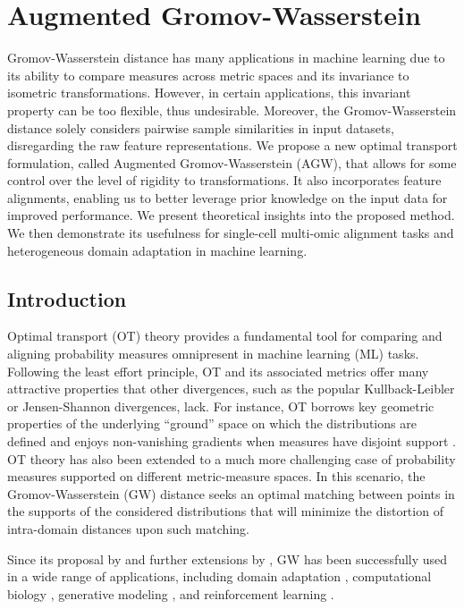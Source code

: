 
\chapter[Augmented Gromov-Wasserstein]{Augmented Gromov-Wasserstein}

\localtableofcontents*


Gromov-Wasserstein distance has many applications in machine learning due to its ability
to compare measures across metric spaces and its invariance to isometric transformations. However,
in certain applications, this invariant property can be too flexible, thus undesirable. Moreover,
the Gromov-Wasserstein distance solely considers pairwise sample similarities in input datasets,
disregarding the raw feature representations. We propose a new optimal transport formulation,
called Augmented Gromov-Wasserstein (AGW), that allows for some control over the
level of rigidity to transformations. It also incorporates feature alignments,
enabling us to better leverage prior knowledge on the input data for improved performance.
We present theoretical insights into the proposed method. We then demonstrate its usefulness
for single-cell multi-omic alignment tasks and heterogeneous domain adaptation in machine learning.

\section{Introduction}

Optimal transport (OT) theory provides a fundamental tool for comparing and
aligning probability measures omnipresent in machine learning (ML) tasks.
Following the least effort principle, OT and its associated metrics offer
many attractive properties that other divergences, such as the popular Kullback-Leibler or
Jensen-Shannon divergences, lack. For instance, OT borrows key geometric properties of
the underlying ``ground'' space on which the distributions are defined \citep{Villani03}
and enjoys non-vanishing gradients when measures have disjoint support \citep{Arjovsky17}.
OT theory has also been extended to a much more challenging case of probability measures supported
on different metric-measure spaces. In this scenario, the Gromov-Wasserstein (GW) distance
seeks an optimal matching between points in the supports of the considered distributions
that will minimize the distortion of intra-domain distances upon such matching.

Since its proposal by \citep{Memoli11} and further extensions by \citep{Peyre16},
GW has been successfully used in a wide range of applications, including
domain adaptation \citep{Yan18}, computational biology
\citep{Nitzan2019,Pamona,UniPort,SpaOTsc,Demetci20,Demetci22,PASTE},
generative modeling \citep{Bunne19}, and reinforcement learning \citep{GW-VAE}.

